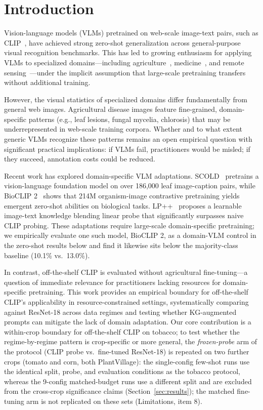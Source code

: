 \documentclass[10pt,a4paper]{article}
\begin{document}
\section{Introduction}
\label{sec:intro}

Vision-language models (VLMs) pretrained on web-scale image-text pairs, such as CLIP~\cite{radford2021learning}, have achieved strong zero-shot generalization across general-purpose visual recognition benchmarks.
This has led to growing enthusiasm for applying VLMs to specialized domains---including agriculture~\cite{pdclip2026}, medicine~\cite{huang2021gloria}, and remote sensing~\cite{liu2024remoteclip}---under the implicit assumption that large-scale pretraining transfers without additional training.

However, the visual statistics of specialized domains differ fundamentally from general web images.
Agricultural disease images feature fine-grained, domain-specific patterns (e.g., leaf lesions, fungal mycelia, chlorosis) that may be underrepresented in web-scale training corpora.
Whether and to what extent generic VLMs recognize these patterns remains an open empirical question with significant practical implications: if VLMs fail, practitioners would be misled; if they succeed, annotation costs could be reduced.

Recent work has explored domain-specific VLM adaptations. SCOLD~\cite{scold2025} pretrains a vision-language foundation model on over 186,000 leaf image-caption pairs, while BioCLIP 2~\cite{bioclip2} shows that 214M organism-image contrastive pretraining yields emergent zero-shot abilities on biological tasks. LP++~\cite{lpplus} proposes a learnable image-text knowledge blending linear probe that significantly surpasses naive CLIP probing. These adaptations require large-scale domain-specific pretraining; we empirically evaluate one such model, BioCLIP 2, as a domain-VLM control in the zero-shot results below and find it likewise sits below the majority-class baseline (10.1\% vs.\ 13.0\%).

In contrast, off-the-shelf CLIP is evaluated without agricultural fine-tuning---a question of immediate relevance for practitioners lacking resources for domain-specific pretraining. This work provides an empirical boundary for off-the-shelf CLIP's applicability in resource-constrained settings, systematically comparing against ResNet-18 across data regimes and testing whether KG-augmented prompts can mitigate the lack of domain adaptation. Our core contribution is a within-crop boundary for off-the-shelf CLIP on tobacco; to test whether the regime-by-regime pattern is crop-specific or more general, the \emph{frozen-probe} arm of the protocol (CLIP probe vs.\ fine-tuned ResNet-18) is repeated on two further crops (tomato and corn, both PlantVillage): the single-config few-shot runs use the identical split, probe, and evaluation conditions as the tobacco protocol, whereas the 9-config matched-budget runs use a different split and are excluded from the cross-crop significance claims (Section~\ref{sec:results}); the matched fine-tuning arm is not replicated on these sets (Limitations, item 8).
\end{document}
